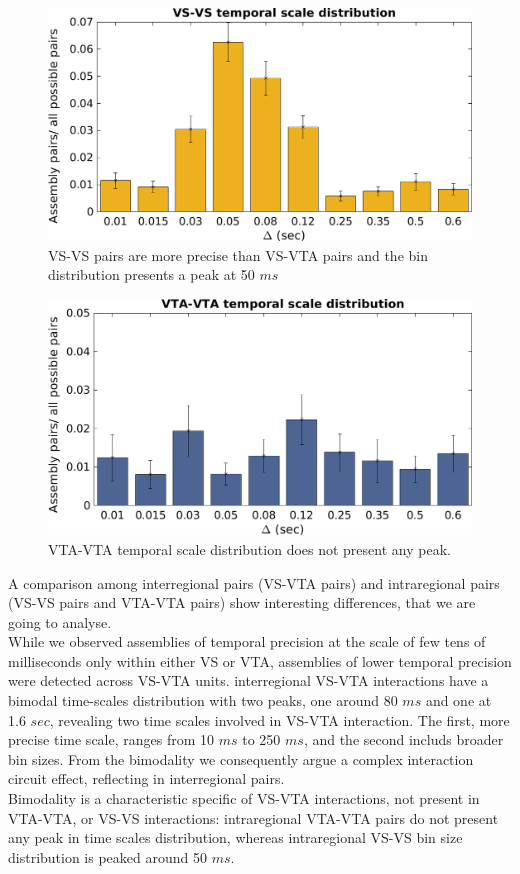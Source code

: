 \begin{figure}[H]
\includegraphics[scale=0.5]{figures/VS_VS_S.png}
\caption{VS-VS pairs are more precise than VS-VTA pairs and the bin distribution presents a peak at 50 $ms$}
\label{fig:BinDistrVS}
\end{figure}
\begin{figure}[H]
\includegraphics[scale=0.5]{figures/VTA_VTA_S.png}
\caption{VTA-VTA temporal scale distribution does not present any peak.}
\label{fig:BinDistrVTA}
\end{figure}
A comparison among interregional pairs (VS-VTA pairs) and intraregional pairs (VS-VS pairs and VTA-VTA pairs) show interesting differences, that we are going to analyse.\\
While we observed assemblies of temporal precision at the scale of few tens of milliseconds only within either VS or VTA, assemblies of lower temporal precision were detected across VS-VTA units. interregional VS-VTA interactions have a bimodal time-scales distribution with two peaks, one around 80 $ms$ and one at 1.6 $sec$, revealing two time scales involved in VS-VTA interaction. The first, more precise time scale, ranges from 10 $ms$ to 250 $ms$, and the second includs broader bin sizes. From the bimodality we consequently argue a complex interaction circuit effect, reflecting in interregional pairs.\\Bimodality is a characteristic specific of VS-VTA interactions, not present in VTA-VTA, or VS-VS interactions: intraregional VTA-VTA pairs do not present any peak in time scales distribution, whereas intraregional VS-VS bin size distribution is peaked around 50 $ms$.  
